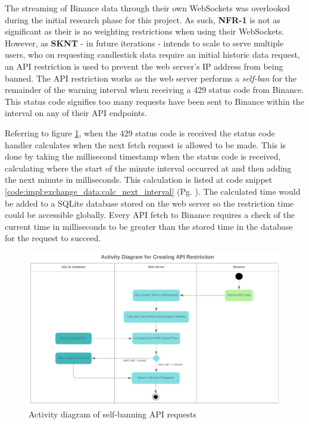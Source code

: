 The streaming of Binance data through their own WebSockets was overlooked during the initial research phase for this project. As such, \textbf{NFR-1} is not as significant as their is no weighting restrictions when using their WebSockets. However, as \textbf{SKNT} - in future iterations - intends to scale to serve multiple users, who on requesting candlestick data require an initial historic data request, an API restriction is used to prevent the web server's IP address from being banned. The API restriction works as the web server performs a \textit{self-ban} for the remainder of the warning interval when receiving a 429 status code from Binance. This status code signifies too many requests have been sent to Binance within the interval on any of their API endpoints.

Referring to figure \ref{fig:implementation:AD_API_RESTRICT}, when the 429 status code is received the status code handler calculates when the next fetch request is allowed to be made. This is done by taking the millisecond timestamp when the status code is received, calculating where the start of the minute interval occurred at and then adding the next minute in milliseconds. This calculation is listed at code snippet \ref{code:impl:exchange_data:calc_next_interval} (Pg. \pageref{code:impl:exchange_data:calc_next_interval}). The calculated time would be added to a SQLite database stored on the web server so the restriction time could be accessible globally. Every API fetch to Binance requires a check of the current time in milliseconds to be greater than the stored time in the database for the request to succeed. %

\begin{figure}[!htb]
    \centering
	\includegraphics[width=\textwidth]{content/graphics/diagrams/AD_set_api_ban.png}
	\caption{Activity diagram of self-banning API requests}
	\label{fig:implementation:AD_API_RESTRICT}
\end{figure}

